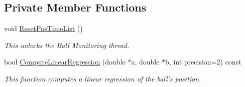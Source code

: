 \subsection*{Private Member Functions}
\begin{DoxyCompactItemize}
\item 
void \hyperlink{classBallMonitor_a09ed61cf1852d45f03e7aacdebfe0175}{ResetPosTimeList} ()
\begin{DoxyCompactList}\small\item\em This unlocks the Ball Monitoring thread. \item\end{DoxyCompactList}\item 
bool \hyperlink{classBallMonitor_a49645db55ca752adbc2a5a074c7314be}{ComputeLinearRegression} (double $\ast$a, double $\ast$b, int precision=2) const 
\begin{DoxyCompactList}\small\item\em This function computes a linear regression of the ball's position. \item\end{DoxyCompactList}\end{DoxyCompactItemize}
